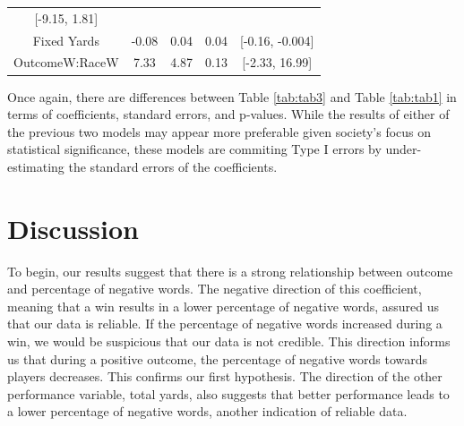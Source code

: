 \documentclass[12pt,twoside]{reedthesis}
\begin{document}
\begin{longtable}[]{@{}ccccc@{}}
\begin{minipage}[t]{0.17\columnwidth}
{[}-9.15, 1.81{]}\strut
\end{minipage}\tabularnewline
\begin{minipage}[t]{0.25\columnwidth}\centering\strut
Fixed Yards\strut
\end{minipage} & \begin{minipage}[t]{0.15\columnwidth}\centering\strut
-0.08\strut
\end{minipage} & \begin{minipage}[t]{0.15\columnwidth}\centering\strut
0.04\strut
\end{minipage} & \begin{minipage}[t]{0.15\columnwidth}\centering\strut
0.04\strut
\end{minipage} & \begin{minipage}[t]{0.17\columnwidth}\centering\strut
{[}-0.16, -0.004{]}\strut
\end{minipage}\tabularnewline
\begin{minipage}[t]{0.25\columnwidth}\centering\strut
OutcomeW:RaceW\strut
\end{minipage} & \begin{minipage}[t]{0.15\columnwidth}\centering\strut
7.33\strut
\end{minipage} & \begin{minipage}[t]{0.15\columnwidth}\centering\strut
4.87\strut
\end{minipage} & \begin{minipage}[t]{0.15\columnwidth}\centering\strut
0.13\strut
\end{minipage} & \begin{minipage}[t]{0.17\columnwidth}\centering\strut
{[}-2.33, 16.99{]}\strut
\end{minipage}\tabularnewline
\bottomrule
\end{longtable}
Once again, there are differences between Table \ref{tab:tab3} and Table
\ref{tab:tab1} in terms of coefficients, standard errors, and p-values.
While the results of either of the previous two models may appear more
preferable given society's focus on statistical significance, these
models are commiting Type I errors by under-estimating the standard
errors of the coefficients.

\section{Discussion}\label{discussion}

To begin, our results suggest that there is a strong relationship
between outcome and percentage of negative words. The negative direction
of this coefficient, meaning that a win results in a lower percentage of
negative words, assured us that our data is reliable. If the percentage
of negative words increased during a win, we would be suspicious that
our data is not credible. This direction informs us that during a
positive outcome, the percentage of negative words towards players
decreases. This confirms our first hypothesis. The direction of the
other performance variable, total yards, also suggests that better
performance leads to a lower percentage of negative words, another
indication of reliable data.
\end{document}
